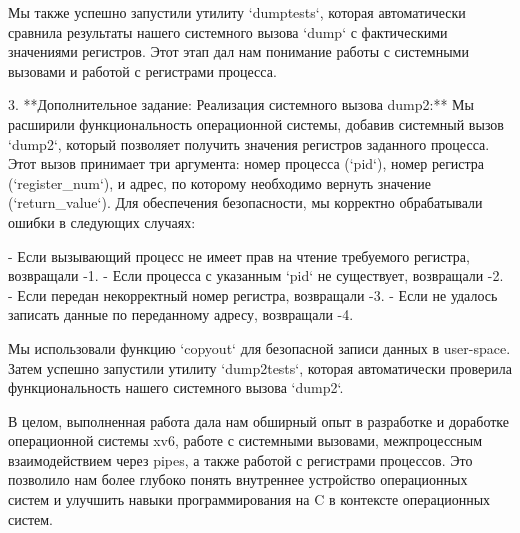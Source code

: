    Мы также успешно запустили утилиту `dumptests`, которая автоматически сравнила результаты нашего системного вызова `dump` с фактическими значениями регистров. Этот этап дал нам понимание работы с системными вызовами и работой с регистрами процесса.

3. **Дополнительное задание: Реализация системного вызова dump2:**
   Мы расширили функциональность операционной системы, добавив системный вызов `dump2`, который позволяет получить значения регистров заданного процесса. Этот вызов принимает три аргумента: номер процесса (`pid`), номер регистра (`register_num`), и адрес, по которому необходимо вернуть значение (`return_value`). Для обеспечения безопасности, мы корректно обрабатывали ошибки в следующих случаях:

   - Если вызывающий процесс не имеет прав на чтение требуемого регистра, возвращали -1.
   - Если процесса с указанным `pid` не существует, возвращали -2.
   - Если передан некорректный номер регистра, возвращали -3.
   - Если не удалось записать данные по переданному адресу, возвращали -4.

   Мы использовали функцию `copyout` для безопасной записи данных в user-space. Затем успешно запустили утилиту `dump2tests`, которая автоматически проверила функциональность нашего системного вызова `dump2`.

В целом, выполненная работа дала нам обширный опыт в разработке и доработке операционной системы xv6, работе с системными вызовами, межпроцессным взаимодействием через pipes, а также работой с регистрами процессов. Это позволило нам более глубоко понять внутреннее устройство операционных систем и улучшить навыки программирования на C в контексте операционных систем.
